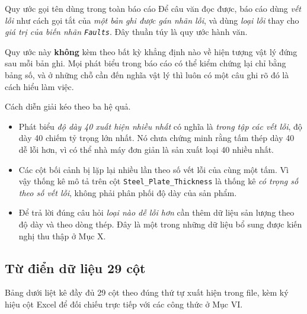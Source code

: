 \documentclass[12pt]{article}
\begin{document}
\begin{guidelinebox}{Quy ước gọi tên dùng trong toàn báo cáo}
Để câu văn đọc được, báo cáo dùng \emph{vết lỗi} như cách gọi tắt của \emph{một bản ghi được gán nhãn lỗi}, và dùng \emph{loại lỗi} thay cho \emph{giá trị của biến nhãn \texttt{Faults}}. Đây thuần túy là quy ước hành văn.

\noindent Quy ước này \textbf{không} kèm theo bất kỳ khẳng định nào về hiện tượng vật lý đứng sau mỗi bản ghi. Mọi phát biểu trong báo cáo có thể kiểm chứng lại chỉ bằng bảng số, và ở những chỗ cần đến nghĩa vật lý thì luôn có một câu ghi rõ đó là cách hiểu làm việc.
\end{guidelinebox}

\noindent Cách diễn giải kéo theo ba hệ quả.

\begin{itemize}
  \item Phát biểu \emph{độ dày 40 xuất hiện nhiều nhất} có nghĩa là \emph{trong tập các vết lỗi}, độ dày 40 chiếm tỷ trọng lớn nhất. Nó chưa chứng minh rằng tấm thép dày 40 dễ lỗi hơn, vì có thể nhà máy đơn giản là sản xuất loại 40 nhiều nhất.
  \item Các cột bối cảnh bị lặp lại nhiều lần theo số vết lỗi của cùng một tấm. Vì vậy thống kê mô tả trên cột \texttt{Steel\_Plate\_Thickness} là thống kê \emph{có trọng số theo số vết lỗi}, không phải phân phối độ dày của sản phẩm.
  \item Để trả lời đúng câu hỏi \emph{loại nào dễ lỗi hơn} cần thêm dữ liệu sản lượng theo độ dày và theo dòng thép. Đây là một trong những dữ liệu bổ sung được kiến nghị thu thập ở Mục X.
\end{itemize}

\subsection{Từ điển dữ liệu 29 cột}

Bảng dưới liệt kê đầy đủ 29 cột theo đúng thứ tự xuất hiện trong file, kèm ký hiệu cột Excel để đối chiếu trực tiếp với các công thức ở Mục VI.
\end{document}
